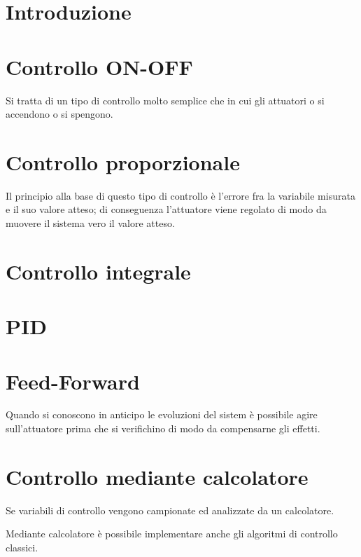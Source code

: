 \section{Introduzione}
\section{Controllo ON-OFF}
Si tratta di un tipo di controllo molto semplice che in cui gli
attuatori o si accendono o si spengono.
\section{Controllo proporzionale}
Il principio alla base di questo tipo di controllo è l'errore fra la
variabile misurata e il suo valore atteso; di conseguenza l'attuatore
viene regolato di modo da muovere il sistema vero il valore atteso.
\section{Controllo integrale}
\section{PID}
\section{Feed-Forward}
Quando si conoscono in anticipo le evoluzioni del sistem è possibile
agire sull'attuatore prima che si verifichino di modo da compensarne
gli effetti.
\section{Controllo mediante calcolatore}
Se variabili di controllo vengono campionate ed analizzate da un
calcolatore.

Mediante calcolatore è possibile implementare anche gli algoritmi di
controllo classici.